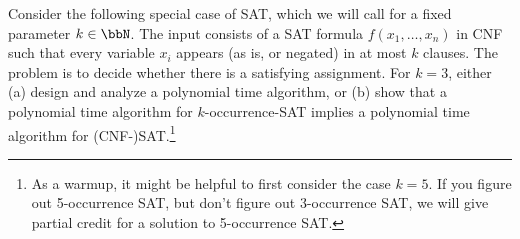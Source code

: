 \documentclass{article}
\begin{document}
\setcounter{section}{9}
\setcounter{exercise}{8}
\begin{exercise}
  Consider the following special case of SAT, which we will call  for a fixed parameter $k \in \bbN$.
  The input consists of a SAT formula $f (x_1, \ldots, x_n)$ in CNF such that every variable $x_i$ appears (as is, or negated) in at most $k$ clauses.
  The problem is to decide whether there is a satisfying assignment.
  For $k = 3$, either (a) design and analyze a polynomial time algorithm, or (b) show that a polynomial time algorithm for $k$-occurrence-SAT implies a polynomial time algorithm for (CNF-)SAT.\footnote{As a warmup, it might be helpful to first consider the case $k = 5$.
  If you figure out 5-occurrence SAT, but don't figure out 3-occurrence SAT, we will give partial credit for a solution to 5-occurrence SAT.}
\end{exercise}
\end{document}
